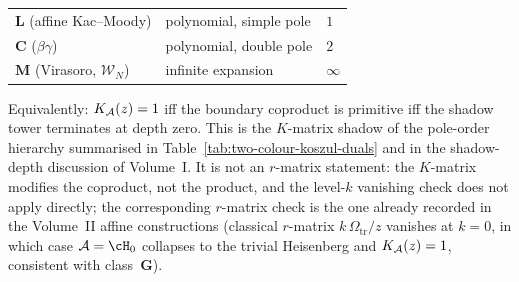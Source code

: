 \begin{remark}
\begin{center}
\begin{tabular}{lll}
$\mathbf{L}$ (affine Kac--Moody) & polynomial, simple pole & $1$ \\
$\mathbf{C}$ ($\beta\gamma$) & polynomial, double pole & $2$ \\
$\mathbf{M}$ (Virasoro, $\mathcal{W}_N$) & infinite expansion & $\infty$ \\
\bottomrule
\end{tabular}
\end{center}
Equivalently: $K_{\mathcal{A}}(z) = 1$ iff the boundary coproduct is primitive iff the shadow tower terminates at depth zero. This is the $K$-matrix shadow of the pole-order hierarchy summarised in Table~\ref{tab:two-colour-koszul-duals} and in the shadow-depth discussion of Volume~I. It is not an $r$-matrix statement: the $K$-matrix modifies the coproduct, not the product, and the level-$k$ vanishing check does not apply directly; the corresponding $r$-matrix check is the one already recorded in the Volume~II affine constructions (classical $r$-matrix $k\,\Omega_{\mathrm{tr}}/z$ vanishes at $k=0$, in which case $\cA = \cH_0$ collapses to the trivial Heisenberg and $K_{\mathcal{A}}(z) = 1$, consistent with class~$\mathbf{G}$).
\end{remark}

